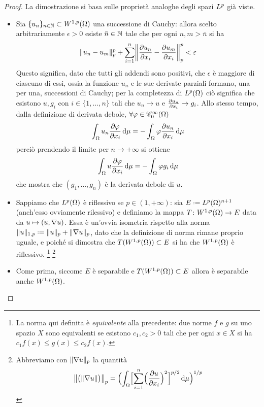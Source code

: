 \begin{proof}
    La dimostrazione si basa sulle proprietà analoghe degli spazi $\lclass[p]$ già viste.
    \begin{itemize}
        \item Sia $\{u_n\}_{n\in\N}\subset\sobW[1,p]{\Omega}$ una successione di Cauchy: allora scelto arbitrariamente $\epsilon>0$ esiste $\bar{n}\in\N$ tale che per ogni $n,m>\bar{n}$ si ha
            \begin{equation}
                \norm{u_n-u_m}_p^p+\sum_{i=1}^n\norm[\bigg]{\drp{u_n}{x_i}-\drp{u_m}{x_i}}_p^p<\epsilon
            \end{equation}
            Questo significa, dato che tutti gli addendi sono positivi, che $\epsilon$ è maggiore di ciascuno di essi, ossia la funzione $u_n$ e le sue derivate parziali formano, una per una, successioni di Cauchy; per la completezza di $\leb[p]{\Omega}$ ciò significa che esistono $u,g_i$ con $i\in\{1,\dotsc,n\}$ tali che $u_n\to u$ e $\drp{u_n}{x_i}\to g_i$.
            Allo stesso tempo, dalla definizione di derivata debole, $\forall\phi\in\contsc[\infty]{\Omega}$
            \begin{equation}
                \int_\Omega u_n\drp{\phi}{x_i}\,\dd\mu=-\int_\Omega\phi\drp{u_n}{x_i}\,\dd\mu
            \end{equation}
            perciò prendendo il limite per $n\to +\infty$ si ottiene
            \begin{equation}
                \int_\Omega u\drp{\phi}{x_i}\,\dd\mu=-\int_\Omega \phi g_i\,\dd\mu
            \end{equation}
            che mostra che $(g_1,\dotsc,g_n)$ è la derivata debole di $u$.
        \item Sappiamo che $\leb[p]{\Omega}$ è riflessivo se $p\in(1,+\infty)$: sia $E\defeq\leb[p]{\Omega}^{n+1}$ (anch'esso ovviamente rilessivo) e definiamo la mappa $T\colon\sobW[1,p]{\Omega}\to E$ data da $u\mapsto(u,\grad u)$.
            Essa è un'ovvia isometria rispetto alla norma $\norm{u}_{1,p}\defeq\norm{u}_p+\norm{\grad u}_p$, dato che la definizione di norma rimane proprio uguale, e poich\'e si dimostra che $T(\sobW[1,p]{\Omega})\subset E$ si ha che $\sobW[1,p]{\Omega}$ è riflessivo.
            \footnote{La norma qui definita è \emph{equivalente} alla precedente: due norme $f$ e $g$ su uno spazio $X$ sono equivalenti se esistono $c_1,c_2>0$ tali che per ogni $x\in X$ si ha $c_1f(x)\le g(x)\le c_2 f(x)$.}
            \footnote{Abbreviamo con $\norm{\grad u}_p$ la quantità
            \begin{equation}
                \norm[\big]{\bigl(\norm{\grad u}\bigr)}_p=\Bigl(\int_\Omega\Bigl[\sum_{i=1}^n\Bigl(\drp{u}{x_i}\Bigr)^2\Bigr]^{p/2}\,\dd\mu\Bigr)^{1/p}
            \end{equation}}
        \item Come prima, siccome $E$ è separabile e $T(\sobW[1,p]{\Omega})\subset E$ allora è separabile anche $\sobW[1,p]{\Omega}$.
    \end{itemize}
\end{proof}
